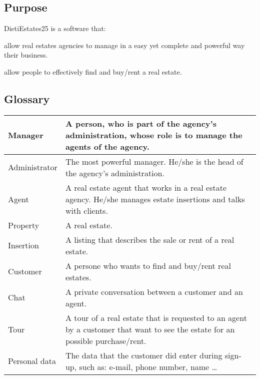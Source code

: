 \subsection{Purpose}
DietiEstates25 is a software that:
\begin{list}{-}{}
    \item allow real estates agencies to manage in a easy yet 
    complete and powerful way their business.
    \item allow people to effectively find and buy/rent a 
    real estate.
\end{list}

\subsection{Glossary}
\begin{center}
\begin{tabular}{| m{8em} | m{8cm}|}
    \hline
    Manager & A person, who is part of the agency's administration,
    whose role is to manage the agents of the agency. \\
    \hline
    Administrator & The most powerful manager. He/she is the
    head of the agency's administration. \\
    \hline
    Agent & A real estate agent that works in a real estate agency.
    He/she manages estate insertions and talks with clients. \\
    \hline
    Property & A real estate. \\
    \hline
    Insertion & A listing that describes the sale or rent
    of a real estate. \\
    \hline
    Customer & A persone who wants to find and buy/rent real estates. \\
    \hline
    Chat & A private conversation between a customer and an agent. \\
    \hline
    Tour & A tour of a real estate that is requested to an agent by a customer that 
    want to see the estate for an possible purchase/rent. \\
    \hline
    Personal data & The data that the customer did enter during
    sign-up, such as: e-mail, phone number, name \dots \\
    \hline

\end{tabular}
\end{center}